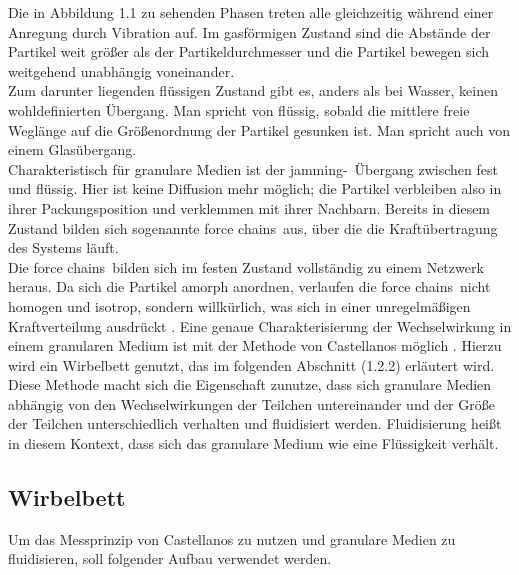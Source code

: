 Die in Abbildung 1.1 zu sehenden Phasen treten alle gleichzeitig während einer Anregung durch Vibration auf. Im gasförmigen Zustand sind die Abstände der Partikel weit größer als der Partikeldurchmesser und die Partikel bewegen sich weitgehend unabhängig voneinander. \\
Zum darunter liegenden flüssigen Zustand gibt es, anders als bei Wasser, keinen wohldefinierten Übergang. Man spricht von flüssig, sobald die mittlere freie Weglänge auf die Größenordnung der Partikel gesunken ist. Man spricht auch von einem Glasübergang. \\
Charakteristisch für granulare Medien ist der \glqq jamming\grqq-\ Übergang zwischen fest und flüssig. Hier ist keine Diffusion mehr möglich; die Partikel verbleiben also in ihrer Packungsposition und verklemmen mit ihrer Nachbarn. Bereits in diesem Zustand bilden sich sogenannte \glqq force chains\grqq \ aus, über die die Kraftübertragung des Systems läuft. \\
Die \glqq force chains\grqq \ bilden sich im festen Zustand vollständig zu einem Netzwerk heraus. Da sich die Partikel amorph anordnen, verlaufen die \glqq force chains\grqq \ nicht homogen und isotrop, sondern willkürlich, was sich in einer unregelmäßigen Kraftverteilung ausdrückt \cite{Darmstadt2015, Fallturmexperiment}.
Eine genaue Charakterisierung der Wechselwirkung in einem granularen Medium ist mit der Methode von Castellanos möglich \cite{Castellanos2000}. Hierzu wird ein Wirbelbett genutzt, das im folgenden Abschnitt (1.2.2) erläutert wird. Diese Methode macht sich die Eigenschaft zunutze, dass sich granulare Medien abhängig von den Wechselwirkungen der Teilchen untereinander und der Größe der Teilchen unterschiedlich verhalten und fluidisiert werden. Fluidisierung heißt in diesem Kontext, dass sich das granulare Medium wie eine Flüssigkeit verhält.

\subsection{Wirbelbett}

Um das Messprinzip von Castellanos zu nutzen und granulare Medien zu fluidisieren, soll folgender Aufbau verwendet werden.


